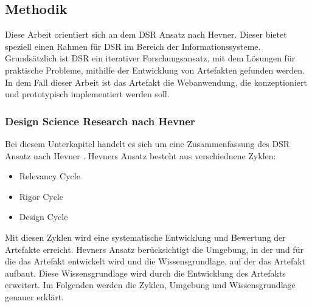 \subsection{Methodik}
Diese Arbeit orientiert sich an dem \ac{DSR} Ansatz nach Hevner. Dieser bietet speziell einen Rahmen für \ac{DSR} im Bereich der Informationssysteme. Grundsätzlich ist \ac{DSR} ein iterativer Forschungsansatz, mit dem Lösungen für praktische Probleme, mithilfe der Entwicklung von Artefakten gefunden werden. In dem Fall dieser Arbeit ist das Artefakt die Webanwendung, die konzeptioniert und prototypisch implementiert werden soll. 

\subsubsection{Design Science Research nach Hevner}
Bei diesem Unterkapitel handelt es sich um eine Zusammenfassung des \ac{DSR} Ansatz nach Hevner \cite[S.~79-81]{Hevner2004}. Hevners Ansatz besteht aus verschiednene Zyklen:

\begin{itemize}
    \item Relevancy Cycle
    \item Rigor Cycle 
    \item Design Cycle
\end{itemize}

Mit diesen Zyklen wird eine systematische Entwicklung und Bewertung der Artefakte erreicht. Hevners Ansatz berücksichtigt die Umgebung, in der und für die das Artefakt entwickelt wird und die Wissensgrundlage, auf der das Artefakt aufbaut. Diese Wissensgrundlage wird durch die Entwicklung des Artefakts erweitert. Im Folgenden werden die Zyklen, Umgebung und Wissensgrundlage genauer erklärt.

